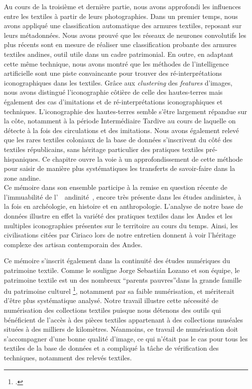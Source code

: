 Au cours de la troisième et dernière partie, nous avons approfondi les influences entre les textiles à partir de leurs photographies. Dans un premier temps, nous avons appliqué une classification automatique des armures textiles, reposant sur leurs métadonnées. Nous avons prouvé que les réseaux de neurones convolutifs les plus récents sont en mesure de réaliser une classification probante des armures textiles andines, outil utile dans un cadre patrimonial. En outre, en adaptant cette même technique, nous avons montré que les méthodes de l'intelligence artificielle sont une piste convaincante pour trouver des ré-interprétations iconographiques dans les textiles. Grâce aux \textit{clustering} des \textit{features} d'images, nous avons distingué l'iconographie côtière de celle des hautes-terres mais également des cas d'imitations et de ré-interprétations iconographiques et techniques. L'iconographie des hautes-terres semble s'être largement répandue sur la côte, notamment à la période Intermédiaire Tardive au cours de laquelle on détecte à la fois des circulations et des imitations. Nous avons également relevé que les rares textiles coloniaux de la base de données s'inscrivent du côté des textiles républicains, sans héritage particulier des pratiques textiles pré-hispaniques. Ce chapitre ouvre la voie à un approfondissement de cette méthode pour saisir de manière plus systématiques les transferts de savoir-faire dans la zone andine. \\

Ce mémoire dans son ensemble participe à la remise en question récente de l'immuabilité de l'~\og~andinité~\fg, encore très présente dans les études andinistes, à la fois en archéologie, en histoire et en anthropologie. L'analyse de notre base de données illustre en effet la variété des pratiques textiles dans les Andes et les multiples iconographies présentes sur le territoire au cours du temps. Ainsi, les civilisations citées par Ciriaco lors de notre entretien donnent à voir l'héritage complexe des artisan contemporain des Andes. 

Ce mémoire s'inscrit également dans la continuité des études numériques du patrimoine textile. Comme le souligne Jorge Sebastián Lozano et son équipe, \og le patrimoine textile est un des nombreux \textquotedblleft parents pauvres\textquotedblright \:dans la grande famille du patrimoine culturel \fg\footcite[p.~76]{sebastianlozanoCatalogosMuseoGran2020}, notamment par sa faible numérisation, et mériterait d'être plus systématique analysé. Notre travail illustre cette nécessité de numérisation des collections textiles puisque nous détenons des outils qui bénéficient de l'accès à des pièces textiles appartenant à des collections muséales situées à des milliers de kilomètres. Néanmoins, ce travail de numérisation doit s'accompagner d'une bonne qualité d'image, ce qui n'était pas le cas pour tous les textiles de la base de données et a compliqué la tâche de vérification des techniques, notamment des relevés textiles.\\

